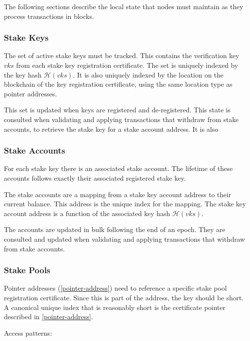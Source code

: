 \documentclass[11pt,a4paper]{article}
\begin{document}
The following sections describe the local state that nodes must maintain
as they process transactions in blocks.

\subsubsection{Stake Keys}\label{stake-keys}

The set of active stake keys must be tracked. This contains the
verification key \(vks\) from each stake key registration certificate.
The set is uniquely indexed by the key hash \(\mathcal{H}(vks)\). It is
also uniquely indexed by the location on the blockchain of the key
registration certificate, using the same location type as pointer
addresses.

This set is updated when keys are registered and de-registered. This
state is consulted when validating and applying transactions that
withdraw from stake accounts, to retrieve the stake key for a stake
account address. It is also

\subsubsection{Stake Accounts}\label{stake-accounts}

For each stake key there is an associated stake account. The lifetime of
these accounts follows exactly their associated registered stake key.

The stake accounts are a mapping from a stake key account address to
their current balance. This address is the unique index for the mapping.
The stake key account address is a function of the associated key hash
\(\mathcal{H}(vks)\).

The accounts are updated in bulk following the end of an epoch. They are
consulted and updated when validating and applying transactions that
withdraw from stake accounts.

\subsubsection{Stake Pools}\label{stake-pools}

Pointer addresses (\ref{pointer-address}) need to reference a specific
stake pool registration certificate. Since this is part of the address,
the key should be short. A canonical unique index that is reasonably
short is the certificate pointer described in \ref{pointer-address}.

Access patterns:
\end{document}
